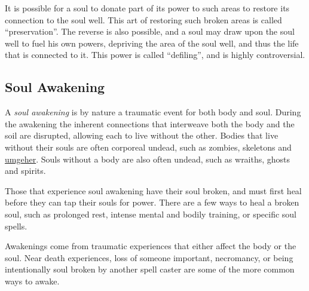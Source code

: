 It is possible for a soul to donate part of its power to such areas to restore
its connection to the soul well. This art of restoring such broken areas is
called ``preservation''. The reverse is also possible, and a soul may draw
upon the soul well to fuel his own powers, depriving the area of the soul
well, and thus the life that is connected to it. This power is called
``defiling'', and is highly controversial.


\subsection{Soul Awakening}
\label{sec:Soul Awakening}

A \emph{soul awakening} is by nature a traumatic event for both body and soul.
During the awakening the inherent connections that interweave both the body and
the soil are disrupted, allowing each to live without the other. Bodies that
live without their souls are often corporeal undead, such as zombies,
skeletons and \hyperref[sec:Umgeher]{umgeher}. Souls without a body are also
often undead, such as wraiths, ghosts and spirits.

Those that experience soul awakening have their soul broken, and must first
heal before they can tap their souls for power. There are a few ways to heal
a broken soul, such as prolonged rest, intense mental and bodily training, or
specific soul spells.

Awakenings come from traumatic experiences that either affect the body or the
soul. Near death experiences, loss of someone important, necromancy, or being
intentionally soul broken by another spell caster are some of the more common
ways to awake.

